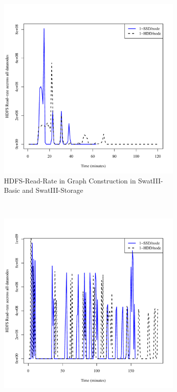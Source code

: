 \documentclass[conference]{IEEEtran}
\begin{document}
\begin{figure}[t]
        \centering
        \begin{subfigure}[b]{0.2\textwidth}
                \includegraphics[width=\textwidth]{Figure/SystemData/Plots/BGHddSsdHdfsRdIops.pdf}
                \caption{HDFS-Read-Rate in Graph Construction in SwatIII-Basic and SwatIII-Storage}
                \label{fig:BGHddSsdHdfsRdIops}
        \end{subfigure}
        ~ %
        \begin{subfigure}[b]{0.2\textwidth}
                \includegraphics[width=\textwidth]{Figure/SystemData/Plots/ECHddSsdHdfsRdIops.pdf}

\end{subfigure}
\end{figure}
\end{document}
